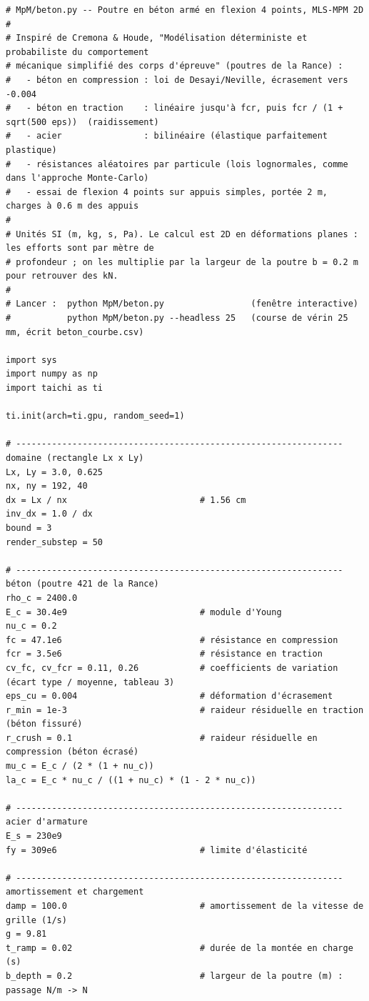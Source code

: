 \documentclass[11pt,a4paper]{article}
\begin{document}
\begin{lstlisting}
# MpM/beton.py -- Poutre en béton armé en flexion 4 points, MLS-MPM 2D
#
# Inspiré de Cremona & Houde, "Modélisation déterministe et probabiliste du comportement
# mécanique simplifié des corps d'épreuve" (poutres de la Rance) :
#   - béton en compression : loi de Desayi/Neville, écrasement vers -0.004
#   - béton en traction    : linéaire jusqu'à fcr, puis fcr / (1 + sqrt(500 eps))  (raidissement)
#   - acier                : bilinéaire (élastique parfaitement plastique)
#   - résistances aléatoires par particule (lois lognormales, comme dans l'approche Monte-Carlo)
#   - essai de flexion 4 points sur appuis simples, portée 2 m, charges à 0.6 m des appuis
#
# Unités SI (m, kg, s, Pa). Le calcul est 2D en déformations planes : les efforts sont par mètre de
# profondeur ; on les multiplie par la largeur de la poutre b = 0.2 m pour retrouver des kN.
#
# Lancer :  python MpM/beton.py                 (fenêtre interactive)
#           python MpM/beton.py --headless 25   (course de vérin 25 mm, écrit beton_courbe.csv)

import sys
import numpy as np
import taichi as ti

ti.init(arch=ti.gpu, random_seed=1)

# ---------------------------------------------------------------- domaine (rectangle Lx x Ly)
Lx, Ly = 3.0, 0.625
nx, ny = 192, 40
dx = Lx / nx                          # 1.56 cm
inv_dx = 1.0 / dx
bound = 3
render_substep = 50

# ---------------------------------------------------------------- béton (poutre 421 de la Rance)
rho_c = 2400.0
E_c = 30.4e9                          # module d'Young
nu_c = 0.2
fc = 47.1e6                           # résistance en compression
fcr = 3.5e6                           # résistance en traction
cv_fc, cv_fcr = 0.11, 0.26            # coefficients de variation (écart type / moyenne, tableau 3)
eps_cu = 0.004                        # déformation d'écrasement
r_min = 1e-3                          # raideur résiduelle en traction (béton fissuré)
r_crush = 0.1                         # raideur résiduelle en compression (béton écrasé)
mu_c = E_c / (2 * (1 + nu_c))
la_c = E_c * nu_c / ((1 + nu_c) * (1 - 2 * nu_c))

# ---------------------------------------------------------------- acier d'armature
E_s = 230e9
fy = 309e6                            # limite d'élasticité

# ---------------------------------------------------------------- amortissement et chargement
damp = 100.0                          # amortissement de la vitesse de grille (1/s)
g = 9.81
t_ramp = 0.02                         # durée de la montée en charge (s)
b_depth = 0.2                         # largeur de la poutre (m) : passage N/m -> N


\end{lstlisting}
\end{document}
